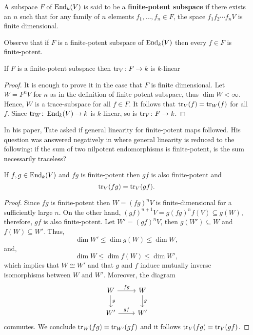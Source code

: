 \begin{definition}\label{def:finite-potent subspace}
	A subspace $F$ of $\operatorname{End}_{k}(V)$ is said to be a \textbf{finite-potent subspace} if there exists an $n$ such that for any family of $n$ elements $f_{1}, \ldots, f_{n}\in F$, the space $f_{1}f_{2}\cdots f_{n}V$ is finite dimensional.
\end{definition}
Observe that if $F$ is a finite-potent subspace of $\operatorname{End}_{k}(V)$ then every $f\in F$ is finite-potent. 
\begin{proposition}\label{prop:linearity-trace}
	If $F$ is a finite-potent subspace then $\operatorname{tr}_{V}\colon F\to k$ is $k$-linear
\end{proposition}
\begin{proof}
	It is enough to prove it in the case that $F$ is finite dimensional. Let $W = F^{n}V$ for $n$ as in the definition of finite-potent subspace, thus $\dim W < \infty$. Hence, $W$ is a trace-subspace for all $f\in F$. It follows that $\operatorname{tr}_{V}(f) = \operatorname{tr}_{W}(f)$ for all $f$. Since $\operatorname{tr}_{W}\colon \operatorname{End}_{k}(V) \to k$ is $k$-linear, so is $\operatorname{tr}_{V}\colon F \to k$.
\end{proof}
\begin{remark}\label{rem:general-linearity-trace}
	In his paper, Tate asked if general linearity for finite-potent maps followed. His question was answered negatively in \cite{TATE-TRACE-COUNTER-EXAMPLE} where general linearity is reduced to the following: if the sum of two nilpotent endomorphisms is finite-potent, is the sum necessarily traceless?  
\end{remark}
\begin{proposition}\label{prop:trace-inavriant-under-commutator}
	If $f,g \in \operatorname{End}_{k}(V)$ and $fg$ is finite-potent then $gf$ is also finite-potent and 
	\[
		\operatorname{tr}_{V}(fg) = \operatorname{tr}_{V}(gf).
	\]
\end{proposition}
\begin{proof}
	Since $fg$ is finite-potent then $W =(fg)^{n}V$ is finite-dimensional for a sufficiently large $n$. On the other hand, $(gf)^{n+1}V= g(fg)^{n}f(V) \subseteq g(W)$, therefore, $gf$ is also finite-potent. Let $W' = (gf)^{n}V$, then $g(W') \subseteq W$ and $f(W) \subseteq W'$. Thus, 
	\[
		\dim W' \leq \dim g(W) \leq \dim W,
	\]
	and, 
	\[
		\dim W \leq \dim f(W) \leq \dim W',
	\]
	which implies that $W\cong W'$ and that $g$ and $f$ induce mutually inverse isomorphisms between $W$ and $W'$. Moreover, the diagram
	\[
		\begin{tikzcd}
			W \arrow[r, "fg"]\arrow[d, "g"] & W \arrow[d, "g"] \\
			W' \arrow[r, "gf"] & W'
		\end{tikzcd}
	\]
	commutes. We conclude $\operatorname{tr}_{W}(fg) = \operatorname{tr}_{W'}(gf)$ and it follows $\operatorname{tr}_{V}(fg) = \operatorname{tr}_{V}(gf)$.
\end{proof}
